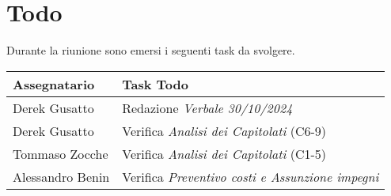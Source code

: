 \section{Todo}
Durante la riunione sono emersi i seguenti task da svolgere.

\begin{center}
  \begin{tabular}{|p{5cm}|p{8cm}|}
    \hline
    \textbf{Assegnatario}       & \textbf{Task Todo} \\ \hline
        Derek Gusatto &  Redazione \textit{Verbale 30/10/2024} \\ \hline
        Derek Gusatto &  Verifica \textit{Analisi dei Capitolati }(C6-9) \\ \hline
        Tommaso Zocche &  Verifica \textit{Analisi dei Capitolati} (C1-5) \\ \hline
        Alessandro Benin &  Verifica \textit{Preventivo costi e Assunzione impegni} \\ \hline
    
  \end{tabular}
\end{center}